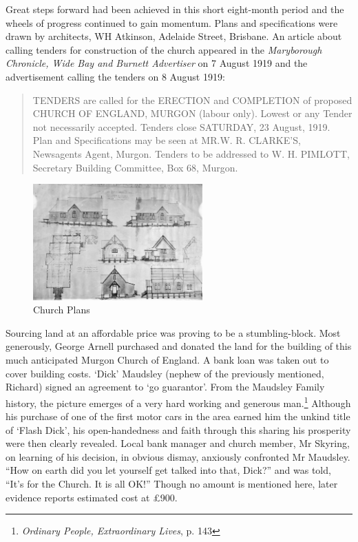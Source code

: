Great steps forward had been achieved in this short eight-month period
and the wheels of progress continued to gain momentum. Plans and
specifications were drawn by architects, WH Atkinson, Adelaide Street,
Brisbane. An article about calling tenders for construction of the
church appeared in the \emph{Maryborough Chronicle, Wide Bay and Burnett
Advertiser} on 7 August 1919 and the advertisement calling the tenders
on 8 August 1919:

\begin{quote}
TENDERS are called for the ERECTION and COMPLETION of proposed CHURCH OF
ENGLAND, MURGON (labour only). Lowest or any Tender not necessarily
accepted. Tenders close SATURDAY, 23 August, 1919. Plan and
Specifications may be seen at MR.W. R. CLARKE'S, Newsagents Agent,
Murgon. Tenders to be addressed to W. H. PIMLOTT, Secretary Building
Committee, Box 68, Murgon.
\end{quote}




\begin{figure}
\begin{center}
\includegraphics[width=0.58\textwidth,right]{images/churchPlans.jpg}
\caption{Church Plans}
\end{center}
\end{figure}


Sourcing land at an affordable price was proving to be a
stumbling-block. Most generously, George Arnell purchased and donated
the land for the building of this much anticipated Murgon Church of
England. A bank loan was taken out to cover building costs. `Dick'
Maudsley (nephew of the previously mentioned, Richard) signed an
agreement to `go guarantor'. From the Maudsley Family history, the
picture emerges of a very hard working and generous man.\footnote{\emph{Ordinary
  People, Extraordinary Lives}, p. 143} Although his purchase of one of
the first motor cars in the area earned him the unkind title of `Flash
Dick', his open-handedness and faith through this sharing his prosperity
were then clearly revealed. Local bank manager and church member, Mr
Skyring, on learning of his decision, in obvious dismay, anxiously
confronted Mr Maudsley. ``How on earth did you let yourself get talked
into that, Dick?'' and was told, ``It's for the Church. It is all OK!''
Though no amount is mentioned here, later evidence reports estimated
cost at \pounds900.

